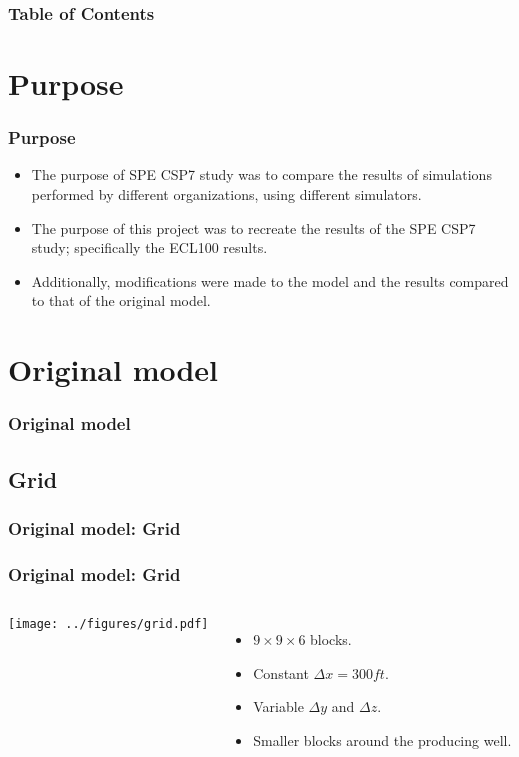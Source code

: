 \documentclass{beamer}
\begin{document}
 
\frame{\titlepage}

\begin{frame}
    \frametitle{Table of Contents}
    \tableofcontents
\end{frame}
 
\section{Purpose}
\begin{frame}
    \frametitle{Purpose}
    \begin{itemize}
        \item The purpose of SPE CSP7 study was to compare the results of simulations performed by different organizations, using different simulators.
        \item The purpose of this project was to recreate the results of the SPE CSP7 study; specifically the ECL100 results.
        \item Additionally, modifications were made to the model and the results compared to that of the original model.
    \end{itemize}
\end{frame}

\section{Original model}
\begin{frame}
    \frametitle{Original model}
\end{frame}

\subsection{Grid}
\begin{frame}
    \frametitle{Original model: Grid}

\end{frame}

\begin{frame}
    \frametitle{Original model: Grid}
    \begin{columns}[c]
            \texttt{[image: ../figures/grid.pdf]}
            \begin{itemize}
                \item $9\times 9 \times 6$ blocks.
                \item Constant $\Delta x = 300 ft$.
                \item Variable $\Delta y$ and $\Delta z$. 
                \item Smaller blocks around the producing well.
            \end{itemize}
    \end{columns}
\end{frame}
\end{document}
